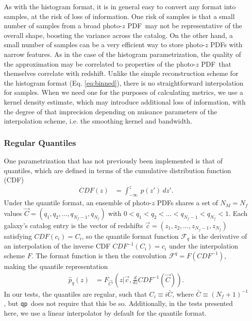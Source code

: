 \documentclass[\docopts]{\docclass}
\newcommand{\qp}{\texttt{qp}}
\newcommand{\pz}{photo-$z$ PDF}
\begin{document}
As with the histogram format, it is in general easy to convert any format into 
samples, at the risk of loss of information.  One risk of samples is that a 
small number of samples from a broad \pz\ may not be representative of the 
overall shape, boosting the variance across the catalog.  On the other hand, a 
small number of samples can be a very efficient way to store \pz s with narrow 
features.  As in the case of the histogram parametrization, the quality of the 
approximation may be correlated to properties of the \pz\ that themselves 
correlate with redshift.  Unlike the simple reconstruction scheme for the 
histogram format (Eq. \ref{eq:binned}), there is no straightforward 
interpolation for samples.  When we need one for the purposes of calculating 
metrics, we use a kernel density estimate, which may introduce additional loss 
of information, with the degree of that imprecision depending on nuisance 
parameters of the interpolation scheme, i.e. the smoothing kernel and bandwidth.

\subsubsection{Regular Quantiles}
\label{sec:quantiles}

One parametrization that has not previously been implemented is that of 
quantiles, which are defined in terms of the cumulative distribution function 
(CDF)
\begin{align}
  \label{eq:cdf}
  CDF(z) &= \int_{-\infty}^{z}\ p(z')\ dz'.
\end{align}
Under the quantile format, an ensemble of \pz s shares a set of $N_{M}=N_{f}$ 
values $\vec{C}=(q_{1}, q_{2}, \dots, q_{N_{f}-1}, q_{N_{f}})$ with 
$0<q_{1}<q_{2}<\dots<q_{N_{f}-1}<q_{N_{f}}<1$.  Each galaxy's catalog entry is 
the vector of redshifts $\vec{c}=(z_{1}, z_{2}, \dots, z_{N_{f}-1}, z_{N_{f}})$ 
satisfying $CDF(c_{i})=C_{i}$, so the quantile format function 
$\mathcal{F}_{q}$ is the derivative of an interpolation of the inverse CDF 
$CDF^{-1}(C_{i})=c_{i}$ under the interpolation scheme $F$.  The format 
function is then the convolution $\mathcal{F}^{q}=F(CDF^{-1})$, making the 
quantile representation
\begin{align}
  \label{eq:quantiles}
  \hat{p}_{q}(z) &= F_{\vec{C}'}(z| \vec{c}, \frac{d}{dz}CDF^{-1}(\vec{C})).
\end{align}
In our tests, the quantiles are regular, such that $C_{i}\equiv i\bar{C}$, 
where $\bar{C}\equiv(N_{f}+1)^{-1}$, but \qp\ does not require that this be so. 
 Additionally, in the tests presented here, we use a linear interpolator by 
default for the quantile format.
\end{document}
